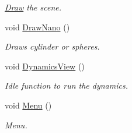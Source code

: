 \begin{DoxyCompactItemize}
\begin{DoxyCompactList}\small\item\em \hyperlink{classDraw}{Draw} the scene. \end{DoxyCompactList}\item 
void \hyperlink{classForces_a7fa19bc7fff5918e9ef3ad1e80d41930}{Draw\+Nano} ()\hypertarget{classForces_a7fa19bc7fff5918e9ef3ad1e80d41930}{}\label{classForces_a7fa19bc7fff5918e9ef3ad1e80d41930}

\begin{DoxyCompactList}\small\item\em Draws cylinder or spheres. \end{DoxyCompactList}\item 
void \hyperlink{classForces_aceab61c4b3e708dc33860c1c2cf2e407}{Dynamics\+View} ()\hypertarget{classForces_aceab61c4b3e708dc33860c1c2cf2e407}{}\label{classForces_aceab61c4b3e708dc33860c1c2cf2e407}

\begin{DoxyCompactList}\small\item\em Idle function to run the dynamics. \end{DoxyCompactList}\item 
void \hyperlink{classForces_afdf1ca9e7afc3e7ec41b47fea4b3d80d}{Menu} ()\hypertarget{classForces_afdf1ca9e7afc3e7ec41b47fea4b3d80d}{}\label{classForces_afdf1ca9e7afc3e7ec41b47fea4b3d80d}

\begin{DoxyCompactList}\small\item\em Menu. \end{DoxyCompactList}\end{DoxyCompactItemize}

